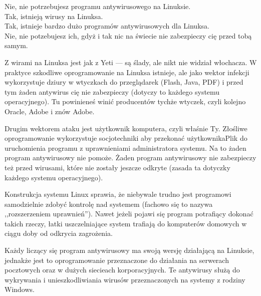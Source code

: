 \noindent \textcolor{ubuntu_orange}{Nie}, nie potrzebujesz programu antywirusowego na Linuksie.\\
\textcolor{ubuntu_orange}{Tak}, istnieją wirusy na Linuksa.\\
\textcolor{ubuntu_orange}{Tak}, istnieje bardzo dużo programów antywirusowych dla Linuksa.\\
\textcolor{ubuntu_orange}{Nie}, nie potzebujesz ich, gdyż i tak nic na świecie nie zabezpieczy cię przed tobą samym.

Z wirami na Linuksa jest jak z Yeti --- są ślady, ale nikt nie widział włochacza. W praktyce szkodliwe oprogramowanie na Linuksa istnieje, ale jako wektor infekcji wykorzystuje dziury w wtyczkach do przeglądarek (Flash, Java, PDF) i przed tym żaden antywirus cię nie zabezpieczy (dotyczy to każdego systemu operacyjnego). Tu powinieneś winić producentów tychże wtyczek, czyli kolejno Oracle, Adobe i znów Adobe.

Drugim wektorem ataku jest użytkownik komputera, czyli właśnie Ty. Złośliwe oprogramowanie wykorzystuje socjotechniki aby przekonać użytkownikaPlik do uruchomienia programu z uprawnieniami administratora systemu. Na to żaden program antywirusowy nie pomoże. Żaden program antywirusowy nie zabezpieczy też przed wirusami, które nie zostały jeszcze odkryte (zasada ta dotyczky każdego systemu operacyjnego).

Konstrukcja systemu Linux sprawia, że niebywale trudno jest programowi samodzielnie zdobyć kontrolę nad systemem (fachowo się to nazywa ,,rozszerzeniem uprawnień''). Nawet jeżeli pojawi się program potrafiący dokonać takich rzeczy, łatki uszczelniające system trafiają do komputerów domowych w ciągu doby od odkrycia zagrożenia.

Każdy liczący się program antywirusowy ma swoją wersję działającą na Linuksie, jednakże jest to oprogramowanie przeznaczone do działania na serwerach pocztowych oraz w dużych siecieach korporacyjnych. Te antywirusy służą do wykrywania i unieszkodliwiania wirusów przeznaczonych na systemy z rodziny Windows.

